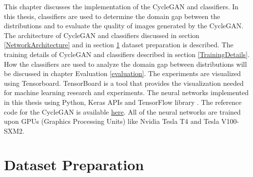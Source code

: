 \justifying
\setlength{\parskip}{1em}

This chapter discusses the implementation of the \ac{CycleGAN} and classifiers. In this thesis, classifiers are used to determine the domain gap between the distributions and to evaluate the quality of images generated by the \ac{CycleGAN}. The architecture of \ac{CycleGAN} and classifiers discussed in section \ref{NetworkArchitecture} and in section \ref{DatasetPreparation} dataset preparation is described. The training details of \ac{CycleGAN} and classifiers described in section \ref{TrainingDetails}. How the classifiers are used to analyze the domain gap between distributions will be discussed in chapter Evaluation \ref{evaluation}. The experiments are visualized using Tensorboard\footnotemark. TensorBoard is a tool that provides the visualization needed for machine learning research and experiments. The neural networks implemented in this thesis using Python, Keras APIs and TensorFlow library \cite{tensorflow2015-whitepaper}. The reference code for the \ac{CycleGAN} is available \href{https://keras.io/examples/generative/cyclegan/}{here}. All of the neural networks are trained upon GPUs (Graphics Processing Units) like Nvidia Tesla T4 and Tesla V100-SXM2. 



\section{Dataset Preparation}\label{DatasetPreparation}


